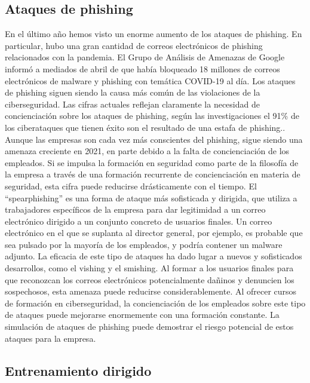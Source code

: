 \documentclass[
]{article}
\begin{document}
\hypertarget{ataques-de-phishing}{%
\subsection{Ataques de phishing}\label{ataques-de-phishing}}

En el último año hemos visto un enorme aumento de los ataques de phishing. En particular, hubo una gran cantidad de correos electrónicos de phishing relacionados con la pandemia. El Grupo de Análisis de Amenazas de Google informó a mediados de abril de que había bloqueado 18 millones de correos electrónicos de malware y phishing con temática COVID-19 al día.
Los ataques de phishing siguen siendo la causa más común de las violaciones de la ciberseguridad. Las cifras actuales reflejan claramente la necesidad de concienciación sobre los ataques de phishing, según las investigaciones el 91\% de los ciberataques que tienen éxito son el resultado de una estafa de phishing..
Aunque las empresas son cada vez más conscientes del phishing, sigue siendo una amenaza creciente en 2021, en parte debido a la falta de concienciación de los empleados. Si se impulsa la formación en seguridad como parte de la filosofía de la empresa a través de una formación recurrente de concienciación en materia de seguridad, esta cifra puede reducirse drásticamente con el tiempo.
El ``spearphishing'' es una forma de ataque más sofisticada y dirigida, que utiliza a trabajadores específicos de la empresa para dar legitimidad a un correo electrónico dirigido a un conjunto concreto de usuarios finales. Un correo electrónico en el que se suplanta al director general, por ejemplo, es probable que sea pulsado por la mayoría de los empleados, y podría contener un malware adjunto. La eficacia de este tipo de ataques ha dado lugar a nuevos y sofisticados desarrollos, como el vishing y el smishing.
Al formar a los usuarios finales para que reconozcan los correos electrónicos potencialmente dañinos y denuncien los sospechosos, esta amenaza puede reducirse considerablemente. Al ofrecer cursos de formación en ciberseguridad, la concienciación de los empleados sobre este tipo de ataques puede mejorarse enormemente con una formación constante. La simulación de ataques de phishing puede demostrar el riesgo potencial de estos ataques para la empresa.

\hypertarget{entrenamiento-dirigido}{%
\subsection{Entrenamiento dirigido}\label{entrenamiento-dirigido}}
\end{document}
